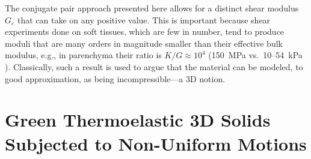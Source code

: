 The conjugate pair approach presented here allows for a distinct shear modulus $G_{\varepsilon}$ that can take on any positive value.  This is important because shear experiments done on soft tissues, which are few in number, tend to produce moduli that are many orders in magnitude smaller than their effective bulk modulus, e.g., in parenchyma their ratio is $K/G \approx 10^{4}$ (150~MPa vs.\ 10--54~kPa \cite{Sarafetal07}).  Classically, such a result is used to argue that the material can be modeled, to  good approximation, as being incompressible---a 3D notion.

\section{Green Thermoelastic 3D Solids Subjected to Non-Uniform Motions}
\label{secNonuniform3D}

